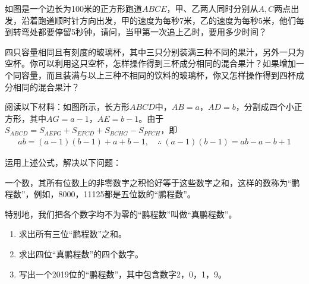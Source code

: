\begin{question}
  如图是一个边长为100米的正方形跑道$ABCE$，甲、乙两人同时分别从$A,C$两点出发，沿着跑道顺时针方向出发，甲的速度为每秒7米，乙的速度为每秒5米，他们每到转弯处都要停留5秒钟，请问，当甲第一次追上乙时，要用多少时间？

  \begin{center}
  \end{center}
\end{question}


\begin{question}
  四只容量相同且有刻度的玻璃杯，其中三只分别装满三种不同的果汁，另外一只为空杯。你可以利用这只空杯，怎样操作得到三杯成分相同的混合果汁？如果增加一个同容量，而且装满与以上三种不相同的饮料的玻璃杯，你又怎样操作得到四杯成分相同的混合果汁？
\end{question}



\begin{question}
  阅读以下材料：如图所示，长方形$ABCD$中，$AB=a$，$AD=b$，分割成四个小正方形，其中$AG=a-1$，$AE=b-1$。由于$S_{ABCD}=S_{AEPG}+S_{EFCD}+S_{BCHG}-S_{PFCH}$，即
  \begin{align*}
    ab=(a-1)(b-1)+a+b-1,\quad \therefore\ (a-1)(b-1)=ab-a-b+1
  \end{align*}

  \begin{center}
  \end{center}
  
  运用上述公式，解决以下问题：

  一个数，其所有位数上的非零数字之积恰好等于这些数字之和，这样的数称为“鹏程数”，例如，8000，11125都是五位数的“鹏程数”。

  特别地，我们把各个数字均不为零的“鹏程数”叫做“真鹏程数”。
  \begin{enumerate}
  \item 求出所有三位“鹏程数”之和。
  \item 求出四位“真鹏程数”的四个数字。
  \item 写出一个2019位的“鹏程数”，其中包含数字2，0，1，9。
  \end{enumerate}
\end{question}



